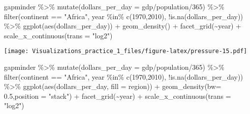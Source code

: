 \documentclass[
]{article}
\newenvironment{Shaded}{\begin{snugshade}}{\end{snugshade}}
\newcommand{\AttributeTok}[1]{\textcolor[rgb]{0.77,0.63,0.00}{#1}}
\newcommand{\DecValTok}[1]{\textcolor[rgb]{0.00,0.00,0.81}{#1}}
\newcommand{\FloatTok}[1]{\textcolor[rgb]{0.00,0.00,0.81}{#1}}
\newcommand{\FunctionTok}[1]{\textcolor[rgb]{0.00,0.00,0.00}{#1}}
\newcommand{\NormalTok}[1]{#1}
\newcommand{\SpecialCharTok}[1]{\textcolor[rgb]{0.00,0.00,0.00}{#1}}
\newcommand{\StringTok}[1]{\textcolor[rgb]{0.31,0.60,0.02}{#1}}
\begin{document}
\begin{Shaded}
\begin{Highlighting}[]
\NormalTok{gapminder }\SpecialCharTok{\%\textgreater{}\%} 
  \FunctionTok{mutate}\NormalTok{(}\AttributeTok{dollars\_per\_day =}\NormalTok{ gdp}\SpecialCharTok{/}\NormalTok{population}\SpecialCharTok{/}\DecValTok{365}\NormalTok{) }\SpecialCharTok{\%\textgreater{}\%} 
  \FunctionTok{filter}\NormalTok{(continent }\SpecialCharTok{==} \StringTok{"Africa"}\NormalTok{, year }\SpecialCharTok{\%in\%} 
  \FunctionTok{c}\NormalTok{(}\DecValTok{1970}\NormalTok{,}\DecValTok{2010}\NormalTok{), }\SpecialCharTok{!}\FunctionTok{is.na}\NormalTok{(dollars\_per\_day)) }\SpecialCharTok{\%\textgreater{}\%} 
  \FunctionTok{ggplot}\NormalTok{(}\FunctionTok{aes}\NormalTok{(dollars\_per\_day)) }\SpecialCharTok{+} \FunctionTok{geom\_density}\NormalTok{() }\SpecialCharTok{+} \FunctionTok{facet\_grid}\NormalTok{(}\SpecialCharTok{\textasciitilde{}}\NormalTok{year) }\SpecialCharTok{+} 
  \FunctionTok{scale\_x\_continuous}\NormalTok{(}\AttributeTok{trans =} \StringTok{"log2"}\NormalTok{)}
\end{Highlighting}
\end{Shaded}

\texttt{[image: Visualizations\_practice\_1\_files/figure-latex/pressure-15.pdf]}

\begin{Shaded}
\begin{Highlighting}[]
\NormalTok{gapminder }\SpecialCharTok{\%\textgreater{}\%} 
  \FunctionTok{mutate}\NormalTok{(}\AttributeTok{dollars\_per\_day =}\NormalTok{ gdp}\SpecialCharTok{/}\NormalTok{population}\SpecialCharTok{/}\DecValTok{365}\NormalTok{) }\SpecialCharTok{\%\textgreater{}\%} 
  \FunctionTok{filter}\NormalTok{(continent }\SpecialCharTok{==} \StringTok{"Africa"}\NormalTok{, year }\SpecialCharTok{\%in\%} \FunctionTok{c}\NormalTok{(}\DecValTok{1970}\NormalTok{,}\DecValTok{2010}\NormalTok{), }
  \SpecialCharTok{!}\FunctionTok{is.na}\NormalTok{(dollars\_per\_day)) }\SpecialCharTok{\%\textgreater{}\%} \FunctionTok{ggplot}\NormalTok{(}\FunctionTok{aes}\NormalTok{(dollars\_per\_day, }\AttributeTok{fill =}\NormalTok{ region)) }\SpecialCharTok{+} 
  \FunctionTok{geom\_density}\NormalTok{(}\AttributeTok{bw=} \FloatTok{0.5}\NormalTok{,}\AttributeTok{position =} \StringTok{"stack"}\NormalTok{) }\SpecialCharTok{+} \FunctionTok{facet\_grid}\NormalTok{(}\SpecialCharTok{\textasciitilde{}}\NormalTok{year) }\SpecialCharTok{+} 
  \FunctionTok{scale\_x\_continuous}\NormalTok{(}\AttributeTok{trans =} \StringTok{"log2"}\NormalTok{)}
\end{Highlighting}
\end{Shaded}
\end{document}

